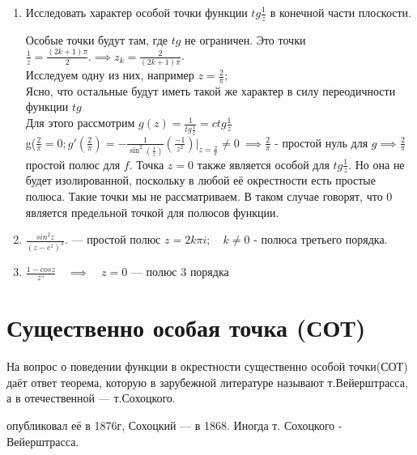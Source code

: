 \documentclass[a4paper, 12pt]{report}
\begin{document}
	\begin{enumerate}
	    \item Исследовать характер особой точки функции $ tg \frac{1}{z}$ в конечной части плоскости. 
	\par\bigskip
	Особые точки будут там, где $tg$ не ограничен. Это точки $\frac{1}{z} = \frac{(2k+1)\pi}{2}. \implies z_k = \frac{2}{(2k+1)\pi}$.
	\\Исследуем одну из них, например $z = \frac{2}{\pi};$
	\\Ясно, что остальные будут иметь такой же характер в силу переодичности функции $tg$
	\\Для этого рассмотрим $g(z) = \frac{1}{tg\frac{1}{z}} = ctg \frac{1}{z}$
	\\g($\frac{2}{\pi} = 0; g'(\frac{2}{\pi}) = - \frac{1}{\sin^2(\frac{1}{z})}(\frac{-1}{z^2})\bigg|_{z = \frac{2}{\pi}} \neq 0 \ \implies \frac{2}{\pi}$ - простой нуль для  $g \implies \frac{2}{\pi}$ простой полюс для $f$. Точка $z=0$ также является особой для $tg \frac{1}{z}$. Но она не будет изолированной, поскольку в любой её окрестности есть простые полюса. Такие точки мы не рассматриваем. В таком случае говорят, что 0 является предельной точкой для полюсов функции.
	
	\item $\frac{sin^2 z}{(z-e^z)^3}.$  --- простой полюс $z = 2k\pi i; \quad k \neq 0$ - полюса третьего порядка.
	\item $\frac{1 - cos z}{z^5} \quad \implies \quad z = 0$ --- полюс 3 порядка
	\end{enumerate}
	
	\section{Существенно особая точка (СОТ)}
	На вопрос о поведении функции в окрестности существенно особой точки(СОТ) даёт ответ теорема, которую в зарубежной литературе называют т.Вейерштрасса, а в отечественной --- т.Сохоцкого. 
	
	 опубликовал её в 1876г, Сохоцкий --- в 1868. Иногда т. Сохоцкого - Вейерштрасса.
	
\end{document}
